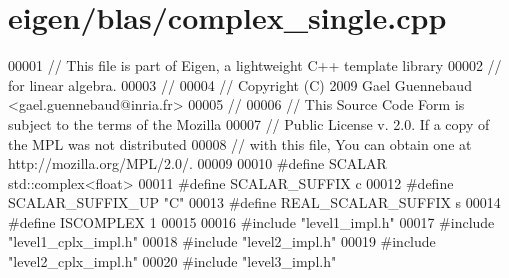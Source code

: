 \hypertarget{eigen_2blas_2complex__single_8cpp_source}{}\section{eigen/blas/complex\+\_\+single.cpp}
\label{eigen_2blas_2complex__single_8cpp_source}

\begin{DoxyCode}
00001 \textcolor{comment}{// This file is part of Eigen, a lightweight C++ template library}
00002 \textcolor{comment}{// for linear algebra.}
00003 \textcolor{comment}{//}
00004 \textcolor{comment}{// Copyright (C) 2009 Gael Guennebaud <gael.guennebaud@inria.fr>}
00005 \textcolor{comment}{//}
00006 \textcolor{comment}{// This Source Code Form is subject to the terms of the Mozilla}
00007 \textcolor{comment}{// Public License v. 2.0. If a copy of the MPL was not distributed}
00008 \textcolor{comment}{// with this file, You can obtain one at http://mozilla.org/MPL/2.0/.}
00009 
00010 \textcolor{preprocessor}{#define SCALAR        std::complex<float>}
00011 \textcolor{preprocessor}{#define SCALAR\_SUFFIX c}
00012 \textcolor{preprocessor}{#define SCALAR\_SUFFIX\_UP "C"}
00013 \textcolor{preprocessor}{#define REAL\_SCALAR\_SUFFIX s}
00014 \textcolor{preprocessor}{#define ISCOMPLEX     1}
00015 
00016 \textcolor{preprocessor}{#include "level1\_impl.h"}
00017 \textcolor{preprocessor}{#include "level1\_cplx\_impl.h"}
00018 \textcolor{preprocessor}{#include "level2\_impl.h"}
00019 \textcolor{preprocessor}{#include "level2\_cplx\_impl.h"}
00020 \textcolor{preprocessor}{#include "level3\_impl.h"}
\end{DoxyCode}
